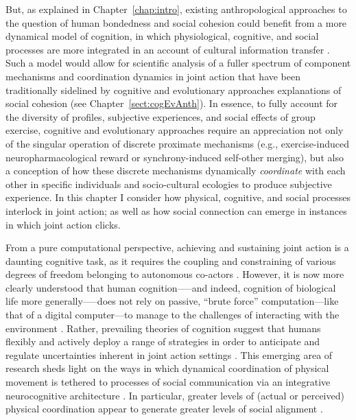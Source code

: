 \begin{CJK}{UTF8}{gbsn}
But, as explained in Chapter~\ref{chap:intro}, existing anthropological approaches to the question of human bondedness and social cohesion could benefit from a more dynamical model of cognition, in which physiological, cognitive, and social processes are more integrated in an account of cultural information transfer  \citep{Roepstorff2010,Badcock2012,Ramstead2017}.  Such a model would allow for scientific analysis of a fuller spectrum of component mechanisms and coordination dynamics in joint action that have been traditionally sidelined by cognitive and evolutionary approaches explanations of social cohesion (see Chapter~\ref{sect:cogEvAnth}).  In essence, to fully account for the diversity of profiles, subjective experiences, and social effects of group exercise, cognitive and evolutionary approaches require an appreciation not only of the singular operation of discrete proximate mechanisms (e.g., exercise-induced neuropharmacological reward or synchrony-induced self-other merging), but also a conception of how these discrete mechanisms dynamically \textit{coordinate} with each other in specific individuals and socio-cultural ecologies to produce subjective experience.  In this chapter I consider how physical, cognitive, and social processes interlock in joint action; as well as how social connection can emerge in instances in which joint action clicks.

From a pure computational perspective, achieving and sustaining joint action is a daunting cognitive task, as it requires the coupling and constraining of various degrees of freedom belonging to autonomous co-actors \citep{Bernstein1967,Turvey1978}.  However, it is now more clearly understood that human cognition—--and indeed, cognition of biological life more generally—--does not rely on passive, ``brute force'' computation---like that of a digital computer---to manage to the challenges of interacting with the environment \citep{Yufik2013}.  Rather, prevailing theories of cognition suggest that humans flexibly and actively deploy a range of strategies in order to anticipate and regulate uncertainties inherent in joint action settings \citep{Friston2010,Clark2015}.
This emerging area of research sheds light on the ways in which dynamical coordination of physical movement is tethered to processes of social communication via an integrative neurocognitive architecture \citep{Semin2008,Wheatley2016,Ramstead2016}.
In particular, greater levels of (actual or perceived) physical coordination appear to generate greater levels of social alignment \citep[e.g., emotional support, perceptions of common goal, and shared social identity][]{Semin2008,Wheatley2012,Launay2016,Mogan2017}.


\end{CJK}
